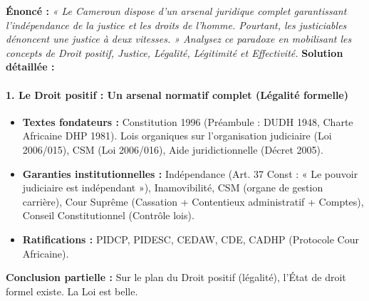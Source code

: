 \documentclass[11pt]{article}
\newcommand{\cle}[1]{{\popxbold\color{popdark}#1}}
\begin{document}
\begin{exoresolu}
    \textbf{Énoncé :} \textit{« Le Cameroun dispose d'un arsenal juridique complet garantissant l'indépendance de la justice et les droits de l'homme. Pourtant, les justiciables dénoncent une justice à deux vitesses. » Analysez ce paradoxe en mobilisant les concepts de Droit positif, Justice, Légalité, Légitimité et Effectivité.}
    \tcblower
    \textbf{Solution détaillée :}
    \paragraph{1. Le Droit positif : Un arsenal normatif complet (Légalité formelle)}
    \begin{itemize}
        \item \textbf{Textes fondateurs :} Constitution 1996 (Préambule : DUDH 1948, Charte Africaine DHP 1981). Lois organiques sur l'organisation judiciaire (Loi 2006/015), CSM (Loi 2006/016), Aide juridictionnelle (Décret 2005).
        \item \textbf{Garanties institutionnelles :} Indépendance (Art. 37 Const : « Le pouvoir judiciaire est indépendant »), Inamovibilité, CSM (organe de gestion carrière), Cour Suprême (Cassation + Contentieux administratif + Comptes), Conseil Constitutionnel (Contrôle lois).
        \item \textbf{Ratifications :} PIDCP, PIDESC, CEDAW, CDE, CADHP (Protocole Cour Africaine).
    \end{itemize}
    \textbf{Conclusion partielle :} Sur le plan du \cle{Droit positif} (légalité), l'État de droit formel existe. La \cle{Loi} est belle.

\end{exoresolu}
\end{document}

